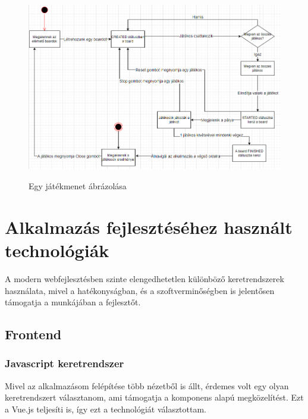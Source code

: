 \documentclass[a4paper,twoside]{article}
\begin{document}
\begin{figure}
	\caption{Egy játékmenet ábrázolása}
	\raggedleft 
	\includegraphics[scale=0.5]{folyamatabra}
	\label{folyamatabra}
\end{figure}
\newpage
\section{Alkalmazás fejlesztéséhez használt technológiák}
A modern webfejlesztésben szinte elengedhetetlen különböző keretrendszerek használata,
mivel a hatékonyságban, és a szoftverminőségben is jelentősen támogatja a munkájában a fejlesztőt.
\subsection{Frontend}

\subsubsection{Javascript keretrendszer}\label{vuejs-tech}
Mivel az alkalmazásom felépítése több nézetből is állt, érdemes volt egy olyan keretrendszert választanom, ami támogatja a komponens 
alapú megközelítést. Ezt a  Vue.js\cite{vuejs} teljesíti is, így ezt a technológiát választottam. 
\end{document}
